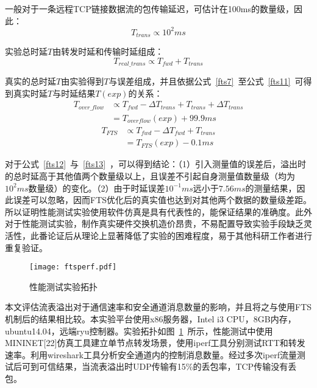 一般对于一条远程TCP链接数据流的包传输延迟，可估计在100ms的数量级，因此：
\begin{equation}\label{fts10}
T_{trans} \propto 10^{2}ms
\end{equation}

实验总时延$ T $由转发时延和传输时延组成：
\begin{equation}\label{fts11}
T_{real\_trans} \propto T_{fwd} + T_{trans}
\end{equation}

真实的总时延$T$由实验得到$T$与误差组成，并且依据公式~\ref{fts7}~至公式~\ref{fts11}~可得到真实时延$T$与时延结果$ T(exp) $的关系：
\begin{align}\label{fts12}
T_{over\_flow} &\propto T_{fwd} - \Delta T_{trans} + T_{trans} + \Delta T_{trans}  \nonumber \\
&=T_{overflow}(exp) + 99.9ms
\end{align}
\begin{align}\label{fts13}
T_{FTS} &\propto T_{fwd} - \Delta T_{fwd} + T_{trans} \nonumber \\
&=T_{FTS}(exp) - 0.1ms
\end{align}

对于公式~\ref{fts12}~与~\ref{fts13}~，可以得到结论：（1）引入测量值的误差后，溢出时的总时延高于其他值两个数量级以上，且误差不引起自身测量值数量级（均为$10^2ms$数量级）的变化。（2）由于时延误差$10^{-1}ms $远小于$ 7.56ms$的测量结果，因此误差可以忽略，因而FTS优化后的真实值也达到对其他两个数据的数量级差距。所以证明性能测试实验使用软件仿真是具有代表性的，能保证结果的准确度。此外对于性能测试实验，制作真实硬件交换机造价昂贵，不易配置导致实验手段缺乏灵活性，此番论证后从理论上显著降低了实验的困难程度，易于其他科研工作者进行重复验证。


\begin{figure}[!ht]
	\centering 
	\vspace{-1.5mm} 
	\texttt{[image: ftsperf.pdf]}
	\caption{性能测试实验拓扑} \label{fig:ftsperf}
\end{figure}

本文评估流表溢出对于通信速率和安全通道消息数量的影响，并且将之与使用FTS机制后的结果相比较。本实验平台使用x86服务器，Intel i3 CPU，8GB内存，ubuntu14.04，远端ryu控制器。实验拓扑如图~\ref{fig:ftsperf}~所示，性能测试中使用MININET[22]仿真工具建立单节点转发场景，使用iperf工具分别测试RTT和转发速率。利用wireshark工具分析安全通道内的控制消息数量。经过多次iperf流量测试后可到可信结果，当流表溢出时UDP传输有15\%的丢包率，TCP传输没有丢包。

